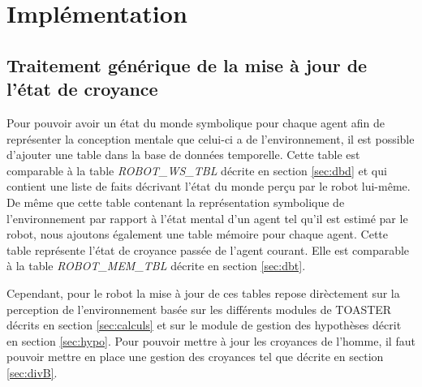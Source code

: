 \documentclass[a4paper,11pt,twoside]{StyleThese}
\begin{document}



\section{Implémentation}

\subsection{Traitement générique de la mise à jour de l'état de croyance}
Pour pouvoir avoir un état du monde symbolique pour chaque agent afin de représenter la conception mentale que celui-ci a de l'environnement, il est possible d'ajouter une table dans la base de données temporelle.
Cette table est comparable à la table \textit{ROBOT\_WS\_TBL} décrite en section \ref{sec:dbd} et qui contient une liste de faits décrivant l'état du monde perçu par le robot lui-même.
De même que cette table contenant la représentation symbolique de l'environnement par rapport à l'état mental d'un agent tel qu'il est estimé par le robot, nous ajoutons également une table mémoire pour chaque agent. Cette table représente l'état de croyance passée de l'agent courant. Elle est comparable à la table \textit{ROBOT\_MEM\_TBL} décrite en section \ref{sec:dbt}.

Cependant, pour le robot la mise à jour de ces tables repose dirèctement sur la perception de l'environnement basée sur les différents modules de TOASTER décrits en section \ref{sec:calculs} et sur le module de gestion des hypothèses décrit en section \ref{sec:hypo}. Pour pouvoir mettre à jour les croyances de l'homme, il faut pouvoir mettre en place une gestion des croyances tel que décrite en section \ref{sec:divB}.
\end{document}
